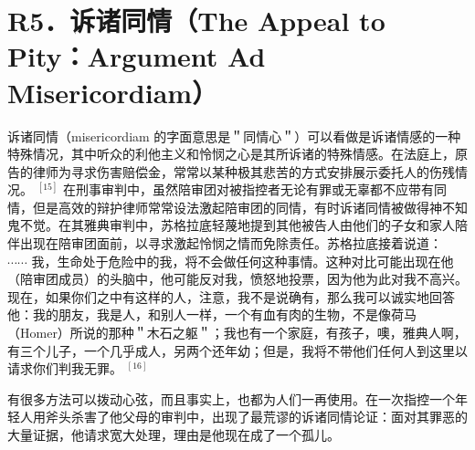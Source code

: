 \section*{R5．诉诸同情（The Appeal to Pity：Argument Ad Misericordiam）}
诉诸同情（misericordiam 的字面意思是＂同情心＂）可以看做是诉诸情感的一种特殊情况，其中听众的利他主义和怜悯之心是其所诉诸的特殊情感。在法庭上，原告的律师为寻求伤害赔偿金，常常以某种极其悲苦的方式安排展示委托人的伤残情况。 ${ }^{[15]}$ 在刑事审判中，虽然陪审团对被指控者无论有罪或无辜都不应带有同情，但是高效的辩护律师常常设法激起陪审团的同情，有时诉诸同情被做得神不知鬼不觉。在其雅典审判中，苏格拉底轻蔑地提到其他被告人由他们的子女和家人陪伴出现在陪审团面前，以寻求激起怜悯之情而免除责任。苏格拉底接着说道：\\
$\cdots \cdots$ 我，生命处于危险中的我，将不会做任何这种事情。这种对比可能出现在他（陪审团成员）的头脑中，他可能反对我，愤怒地投票，因为他为此对我不高兴。现在，如果你们之中有这样的人，注意，我不是说确有，那么我可以诚实地回答他：我的朋友，我是人，和别人一样，一个有血有肉的生物，不是像荷马 （Homer）所说的那种＂木石之躯＂；我也有一个家庭，有孩子，噢，雅典人啊，有三个儿子，一个几乎成人，另两个还年幼；但是，我将不带他们任何人到这里以请求你们判我无罪。 ${ }^{[16]}$

有很多方法可以拨动心弦，而且事实上，也都为人们一再使用。在一次指控一个年轻人用斧头杀害了他父母的审判中，出现了最荒谬的诉诸同情论证：面对其罪恶的大量证据，他请求宽大处理，理由是他现在成了一个孤儿。 